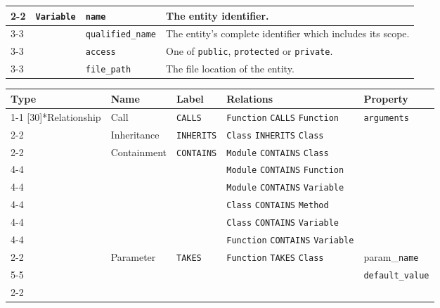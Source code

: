 \begin{tabularx}{\textwidth}{p{1.8cm}llX}
\cmidrule{2-2}\cmidrule{3-3}\cmidrule{4-4}
 & \multirow{4}[8]{*}{\texttt{Variable}} & \texttt{name} & The entity identifier. \\
\cmidrule{3-3}\cmidrule{4-4}
 &  & \texttt{qualified\_\texttt{name}} & The entity's complete identifier which includes its scope. \\
\cmidrule{3-3}\cmidrule{4-4}
 &  & \texttt{access} & One of \texttt{public}, \texttt{protected} or \texttt{private}. \\
\cmidrule{3-3}\cmidrule{4-4}
 &  & \texttt{file\_path} & The file location of the entity. \\
\bottomrule
\end{tabularx}

\begin{tabularx}{\textwidth}{p{1.8cm}llXl}
\toprule
\textbf{Type} & \textbf{Name} & \textbf{Label} & \textbf{Relations} & \textbf{Property} \\
\cmidrule{1-1}\cmidrule{2-2}\cmidrule{3-3}\cmidrule{4-4}\cmidrule{5-5}
\multirow{15}[30]{*}{Relationship} & Call & \texttt{CALLS} & \texttt{Function} \texttt{CALLS} \texttt{Function} & \texttt{arguments} \\
\cmidrule{2-2}\cmidrule{3-3}\cmidrule{4-4}\cmidrule{5-5}
 & Inheritance & \texttt{INHERITS} & \texttt{Class} \texttt{INHERITS} \texttt{Class} &  \\
\cmidrule{2-2}\cmidrule{3-3}\cmidrule{4-4}
 & \multirow{6}[12]{*}{Containment} & \multirow{6}[12]{*}{\texttt{CONTAINS}} & \texttt{Module} \texttt{CONTAINS} \texttt{Class} &  \\
\cmidrule{4-4}
 &  &  & \texttt{Module} \texttt{CONTAINS} \texttt{Function} &  \\
\cmidrule{4-4}
 &  &  & \texttt{Module} \texttt{CONTAINS} \texttt{Variable} &  \\
\cmidrule{4-4}
 &  &  & \texttt{Class} \texttt{CONTAINS} \texttt{Method} &  \\
\cmidrule{4-4}
 &  &  & \texttt{Class} \texttt{CONTAINS} \texttt{Variable} &  \\
\cmidrule{4-4}
 &  &  & \texttt{Function} \texttt{CONTAINS} \texttt{Variable} &  \\
\cmidrule{2-2}\cmidrule{3-3}\cmidrule{4-4}\cmidrule{5-5}
 & \multirow{2}[4]{*}{Parameter} & \multirow{2}[4]{*}{\texttt{TAKES}} & \multirow{2}[4]{*}{\texttt{Function} \texttt{TAKES} \texttt{Class}} & param\_\texttt{name} \\
\cmidrule{5-5}
 &  &  &  & \texttt{default\_value} \\
\cmidrule{2-2}\cmidrule{3-3}\cmidrule{4-4}\cmidrule{5-5}

\end{tabularx}
